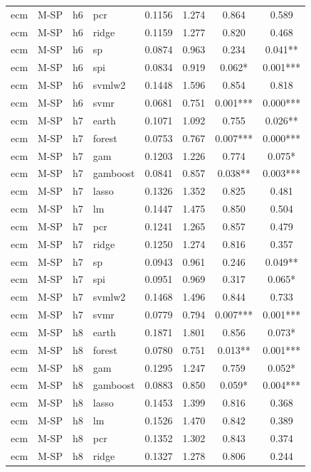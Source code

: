 \begin{ThreePartTable}
\begin{longtable}[t]{llclcccc}
ecm & M-SP & h6 & pcr & 0.1156 & 1.274 & 0.864 & 0.589\\
ecm & M-SP & h6 & ridge & 0.1159 & 1.277 & 0.820 & 0.468\\
ecm & M-SP & h6 & sp & 0.0874 & 0.963 & 0.234 & 0.041**\\
ecm & M-SP & h6 & spi & 0.0834 & 0.919 & 0.062* & 0.001***\\
ecm & M-SP & h6 & svmlw2 & 0.1448 & 1.596 & 0.854 & 0.818\\
ecm & M-SP & h6 & svmr & 0.0681 & 0.751 & 0.001*** & 0.000***\\
\addlinespace
ecm & M-SP & h7 & earth & 0.1071 & 1.092 & 0.755 & 0.026**\\
ecm & M-SP & h7 & forest & 0.0753 & 0.767 & 0.007*** & 0.000***\\
ecm & M-SP & h7 & gam & 0.1203 & 1.226 & 0.774 & 0.075*\\
ecm & M-SP & h7 & gamboost & 0.0841 & 0.857 & 0.038** & 0.003***\\
ecm & M-SP & h7 & lasso & 0.1326 & 1.352 & 0.825 & 0.481\\
ecm & M-SP & h7 & lm & 0.1447 & 1.475 & 0.850 & 0.504\\
ecm & M-SP & h7 & pcr & 0.1241 & 1.265 & 0.857 & 0.479\\
ecm & M-SP & h7 & ridge & 0.1250 & 1.274 & 0.816 & 0.357\\
ecm & M-SP & h7 & sp & 0.0943 & 0.961 & 0.246 & 0.049**\\
ecm & M-SP & h7 & spi & 0.0951 & 0.969 & 0.317 & 0.065*\\
ecm & M-SP & h7 & svmlw2 & 0.1468 & 1.496 & 0.844 & 0.733\\
ecm & M-SP & h7 & svmr & 0.0779 & 0.794 & 0.007*** & 0.001***\\
\addlinespace
ecm & M-SP & h8 & earth & 0.1871 & 1.801 & 0.856 & 0.073*\\
ecm & M-SP & h8 & forest & 0.0780 & 0.751 & 0.013** & 0.001***\\
ecm & M-SP & h8 & gam & 0.1295 & 1.247 & 0.759 & 0.052*\\
ecm & M-SP & h8 & gamboost & 0.0883 & 0.850 & 0.059* & 0.004***\\
ecm & M-SP & h8 & lasso & 0.1453 & 1.399 & 0.816 & 0.368\\
ecm & M-SP & h8 & lm & 0.1526 & 1.470 & 0.842 & 0.389\\
ecm & M-SP & h8 & pcr & 0.1352 & 1.302 & 0.843 & 0.374\\
ecm & M-SP & h8 & ridge & 0.1327 & 1.278 & 0.806 & 0.244\\

\end{longtable}
\end{ThreePartTable}
